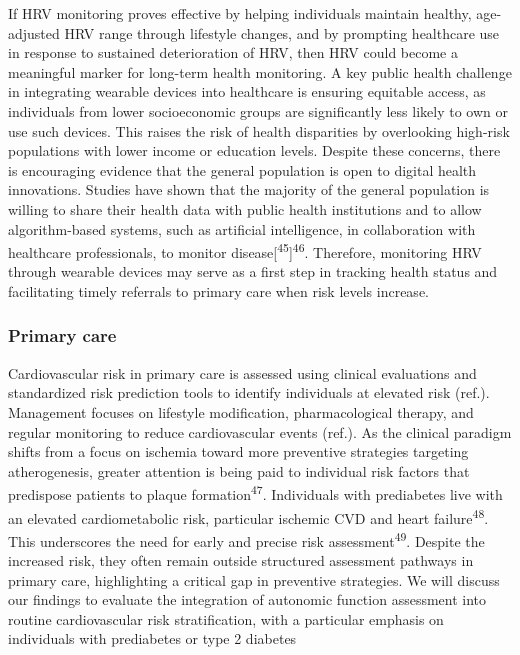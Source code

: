 \documentclass[
  a4paper,
  headsepline=true,
  open=any]{scrbook}
\begin{document}
If HRV monitoring proves effective by helping individuals maintain
healthy, age-adjusted HRV range through lifestyle changes, and by
prompting healthcare use in response to sustained deterioration of HRV,
then HRV could become a meaningful marker for long-term health
monitoring. A key public health challenge in integrating wearable
devices into healthcare is ensuring equitable access, as individuals
from lower socioeconomic groups are significantly less likely to own or
use such devices. This raises the risk of health disparities by
overlooking high-risk populations with lower income or education levels.
Despite these concerns, there is encouraging evidence that the general
population is open to digital health innovations. Studies have shown
that the majority of the general population is willing to share their
health data with public health institutions and to allow algorithm-based
systems, such as artificial intelligence, in collaboration with
healthcare professionals, to monitor
disease{[}\textsuperscript{45}{]}\textsuperscript{46}. Therefore,
monitoring HRV through wearable devices may serve as a first step in
tracking health status and facilitating timely referrals to primary care
when risk levels increase.

\hypertarget{primary-care}{%
\subsubsection{Primary care}\label{primary-care}}

Cardiovascular risk in primary care is assessed using clinical
evaluations and standardized risk prediction tools to identify
individuals at elevated risk (ref.). Management focuses on lifestyle
modification, pharmacological therapy, and regular monitoring to reduce
cardiovascular events (ref.). As the clinical paradigm shifts from a
focus on ischemia toward more preventive strategies targeting
atherogenesis, greater attention is being paid to individual risk
factors that predispose patients to plaque
formation\textsuperscript{47}. Individuals with prediabetes live with an
elevated cardiometabolic risk, particular ischemic CVD and heart
failure\textsuperscript{48}. This underscores the need for early and
precise risk assessment\textsuperscript{49}. Despite the increased risk,
they often remain outside structured assessment pathways in primary
care, highlighting a critical gap in preventive strategies. We will
discuss our findings to evaluate the integration of autonomic function
assessment into routine cardiovascular risk stratification, with a
particular emphasis on individuals with prediabetes or type 2 diabetes
\end{document}
